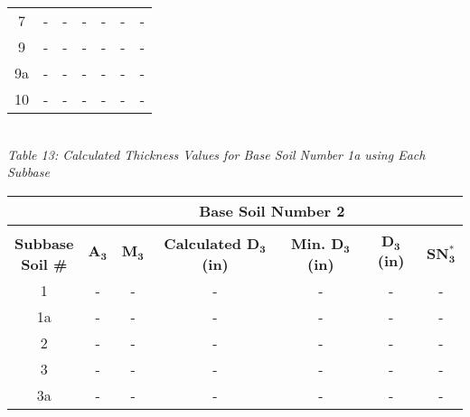 \documentclass{article}
\begin{document}
\begin{center}
\begin{spacing}{1.6}
\begin{tabular}{|c|cccccc|}
                                            7       & -     & -    & -    & -                    & -              & -               \\
                                            9       & -     & -    & -    & -                    & -              & -               \\
                                            9a      & -     & -    & -    & -                    & -              & -               \\
                                            10      & -     & -    & -    & -                    & -              & -               \\\hline
        \end{tabular}
        \vspace{3mm}
        \emph{\\Table 13: Calculated Thickness Values for Base Soil Number 1a using Each Subbase\\}
        \vspace{7mm}
        \begin{tabular}{|c|cccccc|}
            \hline    
            \multicolumn{1}{|l}{}                     & \multicolumn{6}{c|}{\textbf{Base Soil Number 2}}                                              \\\hline
            &&&&&&\\
             \shortstack[c]{\textbf{Subbase}\\\textbf{Soil \#}} & $\bm{A_3}$ & $\bm{M_3}$  & \textbf{Calculated $\bm{D_3}$ (in)} & \textbf{Min. $\bm{D_3}$ (in)} & \textbf{$\bm{D_3}$ (in)} & $\bm{SN_3^*}$  \\\hline
                                            1       & -     & -    & -    & -                    & -              & -               \\
                                            1a      & -     & -    & -    & -                    & -              & -               \\
                                            2       & -     & -    & -    & -                    & -              & -               \\
                                            3       & -     & -    & -    & -                    & -              & -               \\
                                            3a      & -     & -    & -    & -                    & -              & -               \\

\end{tabular}
\end{spacing}
\end{center}
\end{document}
